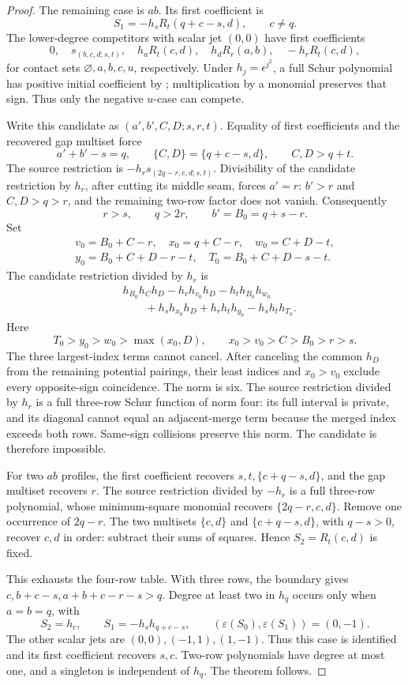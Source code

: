 \documentclass[11pt,a4paper]{amsart}
\numberwithin{equation}{section}
\theoremstyle{plain}
\theoremstyle{definition}
\begin{document}
\begin{proof}
The remaining case is \(ab\).  Its first coefficient is
\[
 S_1=-h_sR_t(q+c-s,d),\qquad c\ne q.
\]
The lower-degree competitors with scalar jet \((0,0)\) have first
coefficients
\[
 0,\quad s_{(b,c,d;s,t)},\quad h_aR_t(c,d),\quad
 h_dR_r(a,b),\quad -h_rR_t(c,d),
\]
for contact sets \(\varnothing,a,b,c,u\), respectively.
Under \(h_j=\epsilon^{j^2}\), a full Schur polynomial has positive
initial coefficient by ; multiplication by a monomial
preserves that sign.  Thus only the negative \(u\)-case can compete.

Write this candidate as \((a',b',C,D;s,r,t)\).  Equality of first
coefficients and the recovered gap multiset force
\[
 a'+b'-s=q,\qquad
 \{C,D\}=\{q+c-s,d\},\qquad C,D>q+t.
\]
The source restriction is
\(-h_r s_{(2q-r,c,d;s,t)}\).  Divisibility of the candidate restriction
by \(h_r\), after cutting its middle seam, forces \(a'=r\):
\(b'>r\) and \(C,D>q>r\), and the remaining two-row factor does not
vanish.  Consequently
\[
 r>s,\qquad q>2r,\qquad b'=B_0=q+s-r.
\]
Set
\begin{gather*}
 v_0=B_0+C-r,\quad x_0=q+C-r,\quad w_0=C+D-t,\\
 y_0=B_0+C+D-r-t,\quad T_0=B_0+C+D-s-t.
\end{gather*}
The candidate restriction divided by \(h_r\) is
\begin{align*}
 &h_{B_0}h_Ch_D-h_rh_{v_0}h_D-h_th_{B_0}h_{w_0}\\
 &\qquad+h_sh_{x_0}h_D+h_rh_th_{y_0}-h_sh_th_{T_0}.
\end{align*}
Here
\[
 T_0>y_0>w_0>\max(x_0,D),\qquad
 x_0>v_0>C>B_0>r>s.
\]
The three largest-index terms cannot cancel.  After canceling the common
\(h_D\) from the remaining potential pairings, their least indices and
\(x_0>v_0\) exclude every opposite-sign coincidence.  The norm is six.
The source restriction divided by \(h_r\) is a full three-row Schur
function of norm four: its full interval is private, and its diagonal
cannot equal an adjacent-merge term because the merged index exceeds both
rows.  Same-sign collisions preserve this norm.  The candidate is
therefore impossible.

For two \(ab\) profiles, the first coefficient recovers
\(s,t,\{c+q-s,d\}\), and the gap multiset recovers \(r\).
The source restriction divided by \(-h_r\) is a full three-row
polynomial, whose minimum-square monomial recovers
\(\{2q-r,c,d\}\).  Remove one occurrence of \(2q-r\).
The two multisets \(\{c,d\}\) and \(\{c+q-s,d\}\), with \(q-s>0\),
recover \(c,d\) in order: subtract their sums of squares.
Hence \(S_2=R_t(c,d)\) is fixed.

This exhausts the four-row table.  With three rows, the boundary gives
\(c,b+c-s,a+b+c-r-s>q\).  Degree at least two in \(h_q\) occurs only
when \(a=b=q\), with
\[
 S_2=h_c,\qquad S_1=-h_sh_{q+c-s},\qquad
 (\varepsilon(S_0),\varepsilon(S_1))=(0,-1).
\]
The other scalar jets are \((0,0),(-1,1),(1,-1)\).
Thus this case is identified and its first coefficient recovers \(s,c\).
Two-row polynomials have degree at most one, and a singleton is independent
of \(h_q\).  The theorem follows.
\end{proof}
\end{document}
